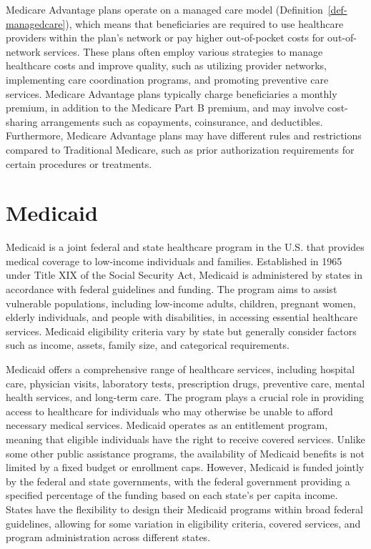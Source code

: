 \documentclass[
  letterpaper,
  DIV=11,
  numbers=noendperiod]{scrreport}
\theoremstyle{definition}
\theoremstyle{remark}
\begin{document}
Medicare Advantage plans operate on a managed care model
(Definition~\ref{def-managedcare}), which means that beneficiaries are
required to use healthcare providers within the plan's network or pay
higher out-of-pocket costs for out-of-network services. These plans
often employ various strategies to manage healthcare costs and improve
quality, such as utilizing provider networks, implementing care
coordination programs, and promoting preventive care services. Medicare
Advantage plans typically charge beneficiaries a monthly premium, in
addition to the Medicare Part B premium, and may involve cost-sharing
arrangements such as copayments, coinsurance, and deductibles.
Furthermore, Medicare Advantage plans may have different rules and
restrictions compared to Traditional Medicare, such as prior
authorization requirements for certain procedures or treatments.

\hypertarget{medicaid}{%
\section{Medicaid}\label{medicaid}}

Medicaid is a joint federal and state healthcare program in the U.S.
that provides medical coverage to low-income individuals and families.
Established in 1965 under Title XIX of the Social Security Act, Medicaid
is administered by states in accordance with federal guidelines and
funding. The program aims to assist vulnerable populations, including
low-income adults, children, pregnant women, elderly individuals, and
people with disabilities, in accessing essential healthcare services.
Medicaid eligibility criteria vary by state but generally consider
factors such as income, assets, family size, and categorical
requirements.

Medicaid offers a comprehensive range of healthcare services, including
hospital care, physician visits, laboratory tests, prescription drugs,
preventive care, mental health services, and long-term care. The program
plays a crucial role in providing access to healthcare for individuals
who may otherwise be unable to afford necessary medical services.
Medicaid operates as an entitlement program, meaning that eligible
individuals have the right to receive covered services. Unlike some
other public assistance programs, the availability of Medicaid benefits
is not limited by a fixed budget or enrollment caps. However, Medicaid
is funded jointly by the federal and state governments, with the federal
government providing a specified percentage of the funding based on each
state's per capita income. States have the flexibility to design their
Medicaid programs within broad federal guidelines, allowing for some
variation in eligibility criteria, covered services, and program
administration across different states.
\end{document}
